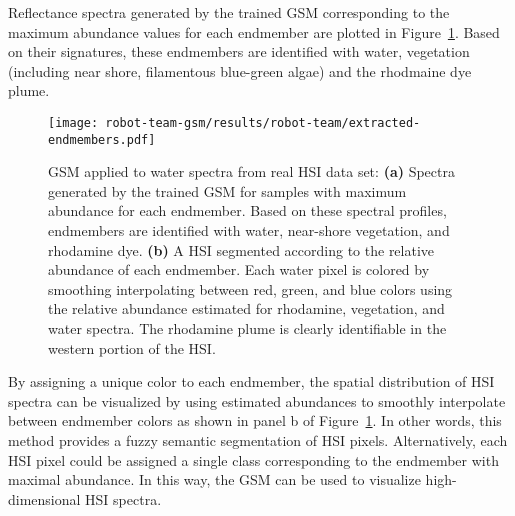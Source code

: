 Reflectance spectra generated by the trained GSM corresponding to the maximum
abundance values for each endmember are plotted in
Figure~\ref{fig:robot-team-endmembers}. Based on their signatures, these
endmembers are identified with water, vegetation (including near shore,
filamentous blue-green algae) and the rhodmaine dye plume.

\begin{figure}[H]
  \centering
  \texttt{[image: robot-team-gsm/results/robot-team/extracted-endmembers.pdf]}
  \caption{GSM applied to water spectra from real HSI data set: \textbf{(a)}
    Spectra generated by the trained GSM for samples with maximum abundance for
    each endmember. Based on these spectral profiles, endmembers are identified
    with water, near-shore vegetation, and rhodamine dye. \textbf{(b)} A HSI
    segmented according to the relative abundance of each endmember. Each water
    pixel is colored by smoothing interpolating between red, green, and blue
    colors using the relative abundance estimated for rhodamine, vegetation, and
    water spectra. The rhodamine plume is clearly identifiable in the western
    portion of the HSI.}
  \label{fig:robot-team-endmembers}
\end{figure}






By assigning a unique color to each endmember, the spatial distribution of HSI
spectra can be visualized by using estimated abundances to smoothly interpolate
between endmember colors as shown in panel b of
Figure~\ref{fig:robot-team-endmembers}. In other words, this method provides a
fuzzy semantic segmentation of HSI pixels. Alternatively, each HSI pixel could
be assigned a single class corresponding to the endmember with maximal
abundance. In this way, the GSM can be used to visualize high-dimensional HSI
spectra.


